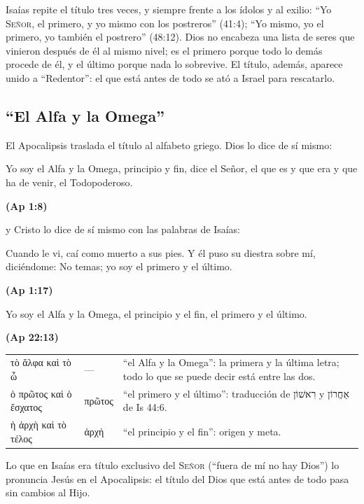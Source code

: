 \documentclass[11pt,letterpaper]{article}
\newcommand{\heb}[1]{\mbox{\foreignlanguage{hebrew}{#1}}}
\newcommand{\grc}[1]{\foreignlanguage{ancientgreek}{#1}}
\newcommand{\SENOR}{\textsc{Señor}}
\newcommand{\fuente}[1]{\par\hfill{\upshape\bfseries\small\textcolor{azul}{#1}}}
\begin{document}
Isaías repite el título tres veces, y siempre frente a los ídolos y al exilio: ``Yo \SENOR, el primero, y yo mismo con los postreros'' (41:4); ``Yo mismo, yo el primero, yo también el postrero'' (48:12). Dios no encabeza una lista de seres que vinieron después de él al mismo nivel; es el primero porque todo lo demás procede de él, y el último porque nada lo sobrevive. El título, además, aparece unido a ``Redentor'': el que está antes de todo se ató a Israel para rescatarlo.

\subsection{``El Alfa y la Omega''}
El Apocalipsis traslada el título al alfabeto griego. Dios lo dice de sí mismo:

\begin{cita}Yo soy el Alfa y la Omega, principio y fin, dice el Señor, el que es y que era y que ha de venir, el Todopoderoso.\fuente{(Ap 1:8)}\end{cita}

\noindent y Cristo lo dice de sí mismo con las palabras de Isaías:

\begin{cita}Cuando le vi, caí como muerto a sus pies. Y él puso su diestra sobre mí, diciéndome: No temas; yo soy el primero y el último.\fuente{(Ap 1:17)}\end{cita}
\begin{cita}Yo soy el Alfa y la Omega, el principio y el fin, el primero y el último.\fuente{(Ap 22:13)}\end{cita}

\begin{filologia}[Ap 1:8, 17; 22:13]
\begin{tabular}{@{}L{3.2cm}L{1.6cm}L{10cm}@{}}
\grc{τὸ ἄλφα καὶ τὸ ὦ} & --- & ``el Alfa y la Omega'': la primera y la última letra; todo lo que se puede decir está entre las dos. \\[2pt]
\grc{ὁ πρῶτος καὶ ὁ ἔσχατος} & \grc{πρῶτος} & ``el primero y el último'': traducción de \heb{רִאשׁוֹן} y \heb{אַחֲרוֹן} de Is 44:6. \\[2pt]
\grc{ἡ ἀρχὴ καὶ τὸ τέλος} & \grc{ἀρχή} & ``el principio y el fin'': origen y meta. \\
\end{tabular}
\end{filologia}

Lo que en Isaías era título exclusivo del \SENOR{} (``fuera de mí no hay Dios'') lo pronuncia Jesús en el Apocalipsis: el título del Dios que está antes de todo pasa sin cambios al Hijo.
\end{document}
